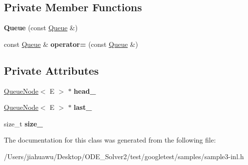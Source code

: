 \subsection*{Private Member Functions}
\begin{DoxyCompactItemize}
\item 
\mbox{\label{class_queue_ac071ee553005a67737d35edeeaafca5b}} 
{\bfseries Queue} (const \mbox{\hyperlink{class_queue}{Queue}} \&)
\item 
\mbox{\label{class_queue_adf6f3eb046365f1b67b6c0bd5da2da59}} 
const \mbox{\hyperlink{class_queue}{Queue}} \& {\bfseries operator=} (const \mbox{\hyperlink{class_queue}{Queue}} \&)
\end{DoxyCompactItemize}
\subsection*{Private Attributes}
\begin{DoxyCompactItemize}
\item 
\mbox{\label{class_queue_abf9219bcea800d26e8bfdb4777d98729}} 
\mbox{\hyperlink{class_queue_node}{Queue\+Node}}$<$ E $>$ $\ast$ {\bfseries head\+\_\+}
\item 
\mbox{\label{class_queue_a7466dca4f96147c9124af582ab170df0}} 
\mbox{\hyperlink{class_queue_node}{Queue\+Node}}$<$ E $>$ $\ast$ {\bfseries last\+\_\+}
\item 
\mbox{\label{class_queue_a7ac3c0717d894e1aecc56f4ddb35c7ea}} 
size\+\_\+t {\bfseries size\+\_\+}
\end{DoxyCompactItemize}


The documentation for this class was generated from the following file\+:\begin{DoxyCompactItemize}
\item 
/\+Users/jiahuawu/\+Desktop/\+O\+D\+E\+\_\+\+Solver2/test/googletest/samples/sample3-\/inl.\+h\end{DoxyCompactItemize}
